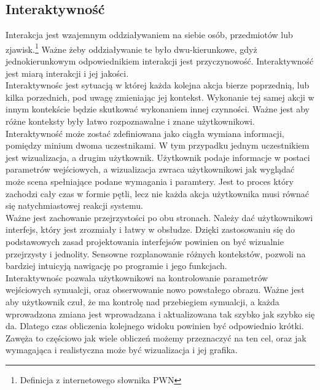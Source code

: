 \documentclass{article} %
\begin{document}
    \subsection{Interaktywność}
        Interakcja jest wzajemnym oddziaływaniem na siebie osób, przedmiotów lub zjawisk.\footnote[1]{Definicja z internetowego słownika PWN} Ważne żeby oddziaływanie te było dwu-kierunkowe, gdyż jednokierunkowym odpowiednikiem interakcji jest przyczynowość. Interaktywność jest miarą interakcji i jej jakości. 
        \\
    
        Interaktywnośc jest sytuacją w której każda kolejna akcja bierze poprzednią, lub kilka porzednich, pod uwagę zmieniając jej kontekst. Wykonanie tej samej akcji w innym kontekście będzie skutkować wykonaniem innej czynności. Ważne jest aby różne konteksty były łatwo rozpoznawalne i znane użytkownikowi.
        \\
    
        Interaktywność może zostać zdefiniowana jako ciągła wymiana informacji, pomiędzy minium dwoma uczestnikami.  W tym przypadku jednym uczestnikiem jest wizualizacja, a drugim użytkownik. Użytkownik podaje informacje w postaci parametrów wejściowych, a wizualizacja zwraca użytkownikowi jak wyglądać może scena spełniające podane wymagania i paramtery. Jest to proces który zachodzi cały czas w formie pętli, lecz nie każda akcja użytkownika musi równać się natychmiastowej reakcji systemu.
        \\
        
        Ważne jest zachowanie przejrzystości po obu stronach. Należy dać użytkownikowi interfejs, który jest zrozmiały i łatwy w obsłudze. Dzięki zastosowaniu się do podstawowych zasad projektowania interfejsów powinien on być wizualnie przejrzysty i jednolity. Sensowne rozplanowanie różnych kontekstów, pozwoli na bardziej intuicyją nawigację po programie i jego funkcjach.
        \\
    
        Interaktywnośc pozwala użytkownikowi na kontrolowanie parametrów wejściowych symualcji, oraz obserwowanie nowo powstałego obrazu. Ważne jest aby użytkownik czuł, że ma kontrolę nad przebiegiem symualcji, a każda wprowadzona zmiana jest wprowadzana i aktualizowana tak szybko jak szybko się da. Dlatego czas obliczenia kolejnego widoku powinien być odpowiednio krótki. Zawęża to częściowo jak wiele obliczeń możemy przeznaczyć na ten cel, oraz jak wymagająca i realistyczna może być wizualizacja i jej grafika. 
        \\
                
\end{document}
